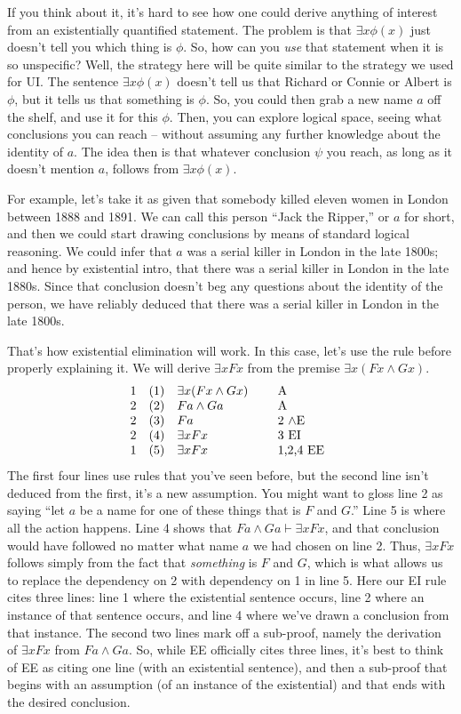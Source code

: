 If you think about it, it's hard to see how one could derive anything
of interest from an existentially quantified statement.  The problem
is that $\exists x\phi (x)$ just doesn't tell you which thing is
$\phi$.  So, how can you {\it use} that statement when it is so
unspecific?  Well, the strategy here will be quite similar to the
strategy we used for UI.  The sentence $\exists x\phi (x)$ doesn't
tell us that Richard or Connie or Albert is $\phi$, but it tells us
that something is $\phi$.  So, you could then grab a new name $a$ off
the shelf, and use it for this $\phi$.  Then, you can explore logical
space, seeing what conclusions you can reach -- without assuming any
further knowledge about the identity of $a$.  The idea then is that
whatever conclusion $\psi$ you reach, as long as it doesn't mention
$a$, follows from $\exists x\phi (x)$.

For example, let's take it as given that somebody killed eleven women
in London between 1888 and 1891.  We can call this person ``Jack the
Ripper,'' or $a$ for short, and then we could start drawing
conclusions by means of standard logical reasoning.  We could infer
that $a$ was a serial killer in London in the late 1800s; and hence by
existential intro, that there was a serial killer in London in the
late 1880s.  Since that conclusion doesn't beg any questions about the
identity of the person, we have reliably deduced that there was a
serial killer in London in the late 1800s.  

That's how existential elimination will work.  In this case, let's use the rule before properly explaining it.  We
will derive $\exists xFx$ from the premise $\exists x(Fx\wedge Gx)$.
\[ \begin{array}{l l >{$}p{2.5cm}<{$} p{1.5cm}}
  1 & (1) & \exists x(Fx\wedge Gx) & A \\
  2 & (2) & Fa\wedge Ga & A \\
  2 & (3) & Fa & 2 $\wedge$E \\
  2 & (4) & \exists xFx & 3 EI \\
  1 & (5) & \exists xFx & 1,2,4 EE \end{array} \]
The first four lines use rules that you've seen before, but the second
line isn't deduced from the first, it's a new
assumption.  You might want to gloss line 2 as saying ``let $a$ be a
name for one of these things that is $F$ and $G$.''  Line 5 is where all the action happens.  Line 4 shows that
$Fa\wedge Ga\vdash \exists xFx$, and that conclusion would
have followed no matter what name $a$ we had chosen on line 2.  Thus,
$\exists xFx$ follows simply from the fact that {\it something} is $F$
and $G$, which is what allows us to replace the dependency on 2 with
dependency on 1 in line 5.  Here our EI rule cites three lines: line 1 where the existential sentence
occurs, line 2 where an instance of that sentence occurs, and line 4
where we've drawn a conclusion from that instance.  The second two
lines mark off a sub-proof, namely the derivation of
$\exists xFx$ from $Fa\wedge Ga$.  So, while EE officially cites three
lines, it's best to think of EE as citing one line (with an
existential sentence), and then a sub-proof that begins with an
assumption (of an instance of the existential) and that ends with the
desired conclusion.

